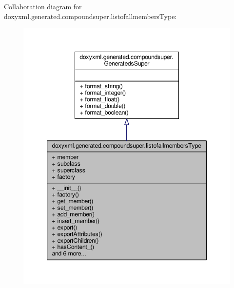 Collaboration diagram for doxyxml.\+generated.\+compoundsuper.\+listofallmembers\+Type\+:
\nopagebreak
\begin{figure}[H]
\begin{center}
\leavevmode
\includegraphics[width=347pt]{de/d26/classdoxyxml_1_1generated_1_1compoundsuper_1_1listofallmembersType__coll__graph}
\end{center}
\end{figure}
